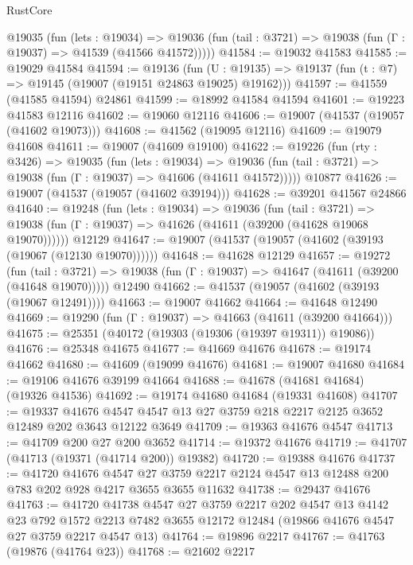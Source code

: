\begin{lexlean}{RustCore}
\begin{coremodule}
    @19035
      (fun (lets : @19034) =>
      @19036 (fun (tail : @3721) => @19038 (fun (Γ : @19037) => @41539 (@41566 @41572)))))
@41584 := @19032 @41583
@41585 := @19029 @41584
@41594 := @19136
    (fun (U : @19135) => @19137 (fun (t : @7) => @19145 (@19007 (@19151 @24863 @19025) @19162)))
@41597 := @41559 (@41585 @41594) @24861
@41599 := @18992 @41584 @41594
@41601 := @19223 @41583 @12116
@41602 := @19060 @12116
@41606 := @19007 (@41537 (@19057 (@41602 @19073)))
@41608 := @41562 (@19095 @12116)
@41609 := @19079 @41608
@41611 := @19007 (@41609 @19100)
@41622 := @19226
    (fun (rty : @3426) =>
    @19035
      (fun (lets : @19034) =>
      @19036 (fun (tail : @3721) => @19038 (fun (Γ : @19037) => @41606 (@41611 @41572)))))
    @10877
@41626 := @19007 (@41537 (@19057 (@41602 @39194)))
@41628 := @39201 @41567 @24866
@41640 := @19248
    (fun (lets : @19034) =>
    @19036
      (fun (tail : @3721) =>
      @19038 (fun (Γ : @19037) => @41626 (@41611 (@39200 (@41628 @19068 @19070))))))
    @12129
@41647 := @19007 (@41537 (@19057 (@41602 (@39193 (@19067 (@12130 @19070))))))
@41648 := @41628 @12129
@41657 := @19272
    (fun (tail : @3721) => @19038 (fun (Γ : @19037) => @41647 (@41611 (@39200 (@41648 @19070)))))
    @12490
@41662 := @41537 (@19057 (@41602 (@39193 (@19067 @12491))))
@41663 := @19007 @41662
@41664 := @41648 @12490
@41669 := @19290 (fun (Γ : @19037) => @41663 (@41611 (@39200 @41664)))
@41675 := @25351 (@40172 (@19303 (@19306 (@19397 @19311)) @19086))
@41676 := @25348 @41675
@41677 := @41669 @41676
@41678 := @19174 @41662
@41680 := @41609 (@19099 @41676)
@41681 := @19007 @41680
@41684 := @19106 @41676 @39199 @41664
@41688 := @41678 (@41681 @41684) (@19326 @41536)
@41692 := @19174 @41680 @41684 (@19331 @41608)
@41707 := @19337
    @41676
    @4547
    @4547
    @13
    @27
    @3759
    @218
    @2217
    @2125
    @3652
    @12489
    @202
    @3643
    @12122
    @3649
@41709 := @19363 @41676 @4547
@41713 := @41709 @200 @27 @200 @3652
@41714 := @19372 @41676
@41719 := @41707 (@41713 (@19371 (@41714 @200)) @19382)
@41720 := @19388 @41676
@41737 := @41720
    @41676
    @4547
    @27
    @3759
    @2217
    @2124
    @4547
    @13
    @12488
    @200
    @783
    @202
    @928
    @4217
    @3655
    @3655
    @11632
@41738 := @29437 @41676
@41763 := @41720
    @41738
    @4547
    @27
    @3759
    @2217
    @202
    @4547
    @13
    @4142
    @23
    @792
    @1572
    @2213
    @7482
    @3655
    @12172
    @12484
    (@19866 @41676 @4547 @27 @3759 @2217 @4547 @13)
@41764 := @19896 @2217
@41767 := @41763 (@19876 (@41764 @23))
@41768 := @21602 @2217

\end{coremodule}
\end{lexlean}
